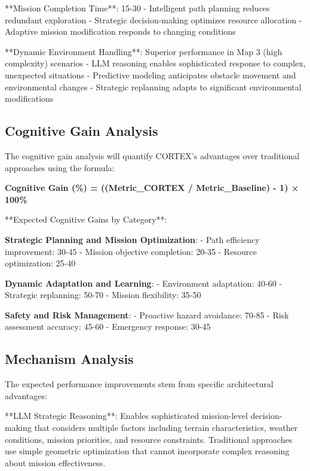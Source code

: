 **Mission Completion Time**: 15-30%
- Intelligent path planning reduces redundant exploration
- Strategic decision-making optimizes resource allocation
- Adaptive mission modification responds to changing conditions

**Dynamic Environment Handling**: Superior performance in Map 3 (high complexity) scenarios
- LLM reasoning enables sophisticated response to complex, unexpected situations
- Predictive modeling anticipates obstacle movement and environmental changes
- Strategic replanning adapts to significant environmental modifications

\subsection{Cognitive Gain Analysis}

The cognitive gain analysis will quantify CORTEX's advantages over traditional approaches using the formula:

\textbf{Cognitive Gain (\%) = ((Metric\_CORTEX / Metric\_Baseline) - 1) × 100\%}

**Expected Cognitive Gains by Category**:

\textbf{Strategic Planning and Mission Optimization}:
- Path efficiency improvement: 30-45%
- Mission objective completion: 20-35%
- Resource optimization: 25-40%

\textbf{Dynamic Adaptation and Learning}:
- Environment adaptation: 40-60%
- Strategic replanning: 50-70%
- Mission flexibility: 35-50%

\textbf{Safety and Risk Management}:
- Proactive hazard avoidance: 70-85%
- Risk assessment accuracy: 45-60%
- Emergency response: 30-45%

\subsection{Mechanism Analysis}

The expected performance improvements stem from specific architectural advantages:

**LLM Strategic Reasoning**: Enables sophisticated mission-level decision-making that considers multiple factors including terrain characteristics, weather conditions, mission priorities, and resource constraints. Traditional approaches use simple geometric optimization that cannot incorporate complex reasoning about mission effectiveness.

